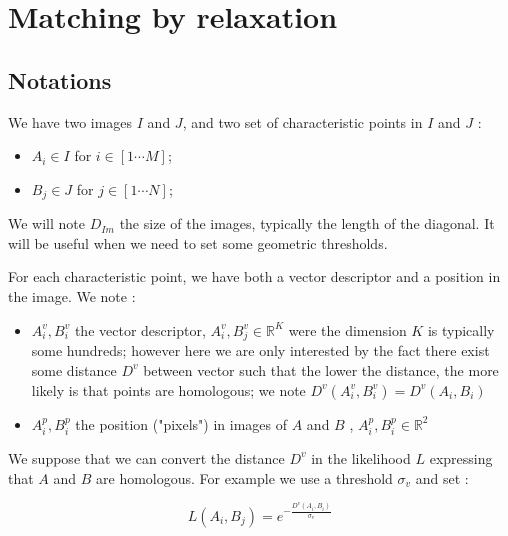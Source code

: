 
\section{Matching by relaxation}

\subsection{Notations}

We have two images $I$ and $J$, and two set of characteristic points
in $I$ and $J$ :

\begin{itemize}
   \item $A_i \in I$ for $i \in [1 \cdots M]$;
   \item $B_j \in J$ for $j \in [1 \cdots N]$;
\end{itemize}

We will note $D_{Im}$ the size of the images, typically the length of the diagonal. It will be useful
when we need to set some geometric thresholds.

For each characteristic point, we have both a vector descriptor and a position in the image.
We note :

\begin{itemize}
   \item $A^v_i , B^v_i$  the vector descriptor,  
         $A^v_i, B^v_j \in \mathbb{R}^K $  were the dimension $K$
         is typically some hundreds; however here we are only interested by the fact  there exist 
         some distance $D^v$ between
         vector such that the lower the distance, the more likely is that points are homologous;
         we note $D^v(A^v_i , B^v_i) = D^v(A_i , B_i) $
   \item  $A^p_i , B^p_i$  the position ("pixels")   in images of $A$ and $B$ , 
         $A^p_i , B^p_i \in \mathbb{R}^2$
\end{itemize}


We suppose that we can convert the distance $D^v$ in the likelihood $L$ expressing  that $A$ and $B$
are homologous. For example we  use a threshold $\sigma_v$ and set :

\begin{equation}
    L(A_i,B_j) =  e^{-\frac{D^v(A_i,B_i)}{\sigma_v}} \label{EQ:LikL}
\end{equation}

